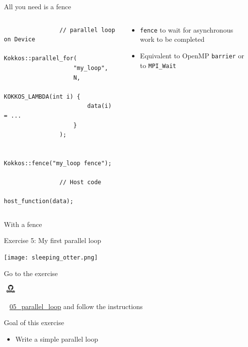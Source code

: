 \documentclass[aspectratio=169]{beamer}
\newcommand{\githublink}[2][2em]{%
    \hspace{-0.25em}%
    \parbox[c][#1][c]{#1}{%
        \includegraphics[width=#1]{GitHub-logo.png}%
    }%
    \hspace{-0.25em}%
    ~%
    #2%
}
\begin{document}
\begin{frame}[fragile]{All you need is a fence}
    \begin{columns}
        \begin{column}{0.5\linewidth}
            \begin{verbatim}
                // parallel loop on Device
                Kokkos::parallel_for(
                    "my_loop",
                    N,
                    KOKKOS_LAMBDA(int i) {
                        data(i) = ...
                    }
                );

                Kokkos::fence("my_loop fence");

                // Host code
                host_function(data);
            \end{verbatim}
        \end{column}
        \begin{column}{0.5\linewidth}
            \begin{itemize}
                \item \texttt{fence} to wait for asynchronous work to be completed
                \item Equivalent to OpenMP \texttt{barrier} or to \texttt{MPI\_Wait}
            \end{itemize}
        \end{column}
    \end{columns}

    \vspace{1em}
     With a fence
\end{frame}


\begin{frame}{Exercise 5: My first parallel loop}
    \begin{center}
        \texttt{[image: sleeping\_otter.png]}
    \end{center}

    Go to the exercise \githublink{\href{https://github.com/CExA-project/cexa-kokkos-tutorials/tree/main/exercises/05_parallel_loop}{05\_parallel\_loop}} and follow the instructions

    \begin{block}{Goal of this exercise}
        \begin{itemize}
            \item Write a simple parallel loop
        \end{itemize}
    \end{block}
\end{frame}
\end{document}
